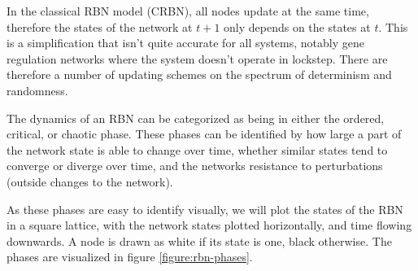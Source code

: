 In the classical RBN model (CRBN), all nodes update at the same time,
therefore the states of the network at $t+1$ only depends on the states at $t$.
This is a simplification that isn't quite accurate for all systems,
notably gene regulation networks where the system doesn't operate in lockstep.
There are therefore a number of updating schemes on the spectrum of determinism and randomness.

The dynamics of an RBN can be categorized as being in either the ordered, critical, or chaotic phase.
These phases can be identified by how large a part of the network state is able to change over time,
whether similar states tend to converge or diverge over time,
and the networks resistance to perturbations (outside changes to the network).

As these phases are easy to identify visually,
we will plot the states of the RBN in a square lattice,
with the network states plotted horizontally, and time flowing downwards.
A node is drawn as white if its state is one, black otherwise.
The phases are visualized in figure \ref{figure:rbn-phases}.

